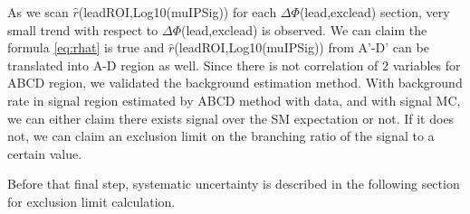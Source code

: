 As we scan $\hat{r}$(leadROI,Log10(muIPSig)) for each $\Delta\Phi$(lead,exclead) section, very small trend with respect to $\Delta\Phi$(lead,exclead) is observed.
We can claim the formula \ref{eq:rhat} is true and $\hat{r}$(leadROI,Log10(muIPSig)) from A'-D' can be translated into A-D region as well.
Since there is not correlation of 2 variables for ABCD region, we validated the background estimation method.
With background rate in signal region estimated by ABCD method with data, and with signal MC, we can either claim there exists signal over the SM expectation or not.
If it does not, we can claim an exclusion limit on the branching ratio of the signal to a certain value.

Before that final step, systematic uncertainty is described in the following section for exclusion limit calculation.




